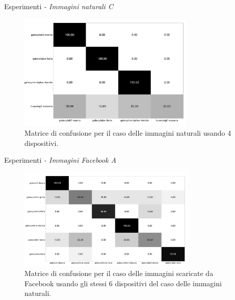 \begin{tframe}{Esperimenti \emph{- Immagini naturali C}}

\begin{figure}[h]
\begin{center}
\includegraphics[width=0.75\textwidth]{../images/confusionmatrix_nat_4.png}
\end{center}
  \caption{Matrice di confusione per il caso delle immagini naturali usando 4 dispositivi.}
\label{fig:validation}
\end{figure}

\end{tframe}

\begin{tframe}{Esperimenti \emph{- Immagini Facebook A}}

\begin{figure}[h]
\begin{center}
\includegraphics[width=0.75\textwidth]{../images/confusion_matrix_fb_highres_6.png}
\end{center}
  \caption{Matrice di confusione per il caso delle immagini scaricate da Facebook usando gli stessi 6 dispositivi del caso delle immagini naturali.}
\label{fig:validation}
\end{figure}

\end{tframe}

